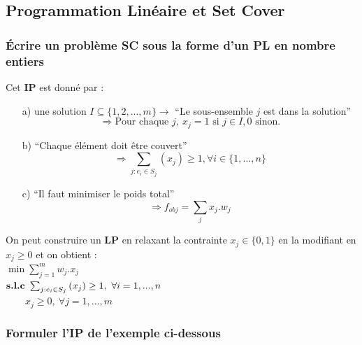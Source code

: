 \documentclass[12pt]{article}
\newcommand{\titre}[1]{\textcolor{title}{#1}}
\begin{document}
\subsection{Programmation Linéaire et Set Cover}

\subsubsection*{Écrire un problème \textbf{\titre{SC}} sous la forme d'un \textbf{\titre{PL}} en nombre entiers}

Cet \textbf{IP} est donné par :
\begin{enumerate}
\item[a)] une solution $I \subseteq \{ 1,2,...,m\} \rightarrow $ ``Le sous-ensemble $j$ est dans la solution'' \\
$$\Rightarrow \text{Pour chaque } j,\ x_j = 1 \text{ si } j \in I, 0 \text{ sinon}.$$
\item[b)] ``Chaque élément doit être couvert'' \\
$$\Rightarrow \sum_{j:e_i\in S_j}{(x_j) \geq 1}, \forall i \in \{1,...,n\}$$
\item[c)] ``Il faut minimiser le poids total''\\
$$\Rightarrow f_{obj} = \sum_j{x_j.w_j}$$
\end{enumerate}

On peut construire un \textbf{LP} en relaxant la contrainte $x_j \in \{0,1\}$ en la modifiant en $x_j \geq 0$ et on obtient : \\
$\min \sum_{j=1}^m{w_j.x_j}$ \\
\indent $\text{\textbf{s.l.c} } \sum_{j:e_i \in S_j}{(x_j)} \geq 1,\ \forall i = 1, ..., n$ \\
\indent $\qquad x_j \geq 0,\ \forall j = 1,...,m$

\subsubsection*{Formuler l'\titre{IP} de l'exemple ci-dessous}
\end{document}
